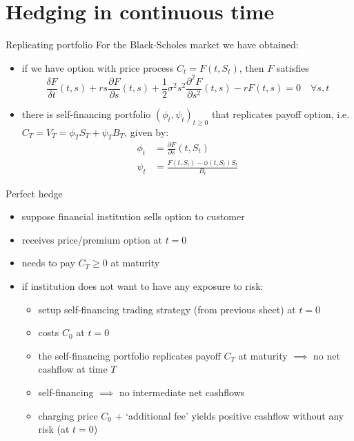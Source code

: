 \documentclass[pdf, handout]{beamer}
\begin{document}
\section{Hedging in continuous time}

\begin{frame}{Replicating portfolio}
For the Black-Scholes market we have obtained:
\begin{itemize}
\item if we have option with price process $C_t=F(t, S_t)$,
then  $F$ satisfies
\[
\frac{\delta F}{\delta t}(t,s) + r s \frac{\partial F}{\partial
s}(t,s) + \frac{1}{2}\sigma^2 s^2 \frac{\partial^2 F}{\partial
s^2}(t,s) -r F(t,s)=0\quad \forall s,t
\]
\item there is self-financing portfolio $(\phi_t,\psi_t)_{t\geq 0}$ that replicates payoff option, i.e. $C_T=V_T=\phi_T S_T+ \psi_T B_T$, given by:
\begin{align*}
\phi_t &=\frac{\partial F}{\partial s}(t,S_t) \\
\psi_t &=\frac{F(t, S_t)-\phi(t,S_t) S_t}{B_t}
\end{align*}
\end{itemize}
\end{frame}

\begin{frame}{Perfect hedge}
\begin{itemize}
\item suppose financial institution sells option to customer
\item receives price/premium option at $t=0$
\item needs to pay $C_T\geq 0$ at maturity
\item if institution does not want to have any exposure to risk:
\begin{itemize}
\item setup self-financing trading strategy (from previous sheet) at $t=0$
\item costs $C_0$ at $t=0$
\item the self-financing portfolio replicates payoff $C_T$ at maturity 
$\implies$ no net cashflow at time $T$
\item self-financing $\implies$ no intermediate net cashflows
\item charging price $C_0$ + `additional fee' yields positive cashflow without any risk
(at $t=0$)
\end{itemize}
\end{itemize}
\end{frame}
\end{document}
